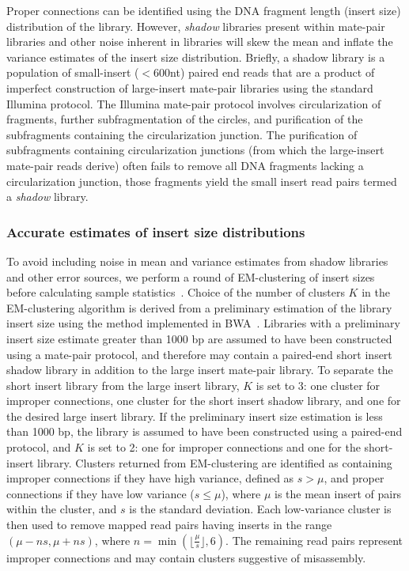 \documentclass{bioinfo}
\begin{document}
 Proper connections
can be identified using the DNA fragment length (insert size) distribution of the library. However, \emph{shadow} libraries present within 
mate-pair libraries and other noise inherent in libraries will skew the mean and inflate the variance 
estimates of the insert size distribution. Briefly, a shadow library is a population of small-insert ($<$600nt) paired end reads
that are a product of imperfect construction of large-insert
mate-pair libraries using the standard Illumina protocol. The Illumina mate-pair protocol involves circularization of fragments, further subfragmentation of the circles, and purification
of the subfragments containing the circularization junction. 
The purification of subfragments containing circularization junctions (from which the large-insert mate-pair reads derive) 
often fails to remove all DNA fragments lacking a circularization junction, those fragments yield the small insert
read pairs termed a \emph{shadow} library. 

\subsubsection{Accurate estimates of insert size distributions}

To avoid including noise in mean and variance estimates from shadow libraries and other error sources, 
we perform a round of EM-clustering of insert sizes before calculating sample statistics~\citep{GuptaChen2010}. Choice of 
the number of clusters $K$ in
the EM-clustering algorithm is derived from a preliminary estimation of the library insert size using the method implemented in
BWA~\citep{bwa}. Libraries with a preliminary
insert size estimate greater than 1000 bp are assumed to have been constructed using a mate-pair protocol, and therefore
may contain a paired-end short insert shadow library in addition to the large insert mate-pair library. To separate the short insert library
from the large insert library, $K$ is set to 3: one cluster for improper connections, one cluster for the short insert
shadow library, and one for the desired large insert library. If the preliminary insert size estimation is less than 1000 bp, the library
is assumed to have been constructed using a paired-end protocol, and $K$ is set to 2: one for improper connections
and one for the short-insert library. Clusters returned from EM-clustering are identified as containing improper connections if 
they have high variance, defined as $s > \mu$, and proper connections if they have low variance ($s \le \mu$), where $\mu$ is the mean insert of pairs within
the cluster, and $s$ is the standard deviation. Each low-variance cluster is then used to remove mapped read pairs 
having inserts in the range $(\mu-ns,\mu+ns)$, where $n = \min(\lfloor\frac{\mu}{s}\rfloor, 6)$.  The remaining read
pairs represent improper connections and may contain clusters suggestive of misassembly.
\end{document}
